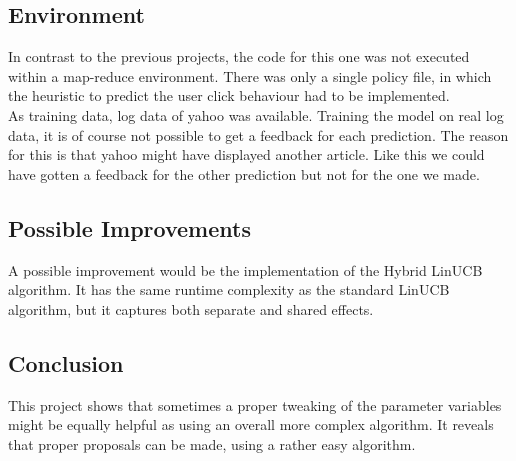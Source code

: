 \documentclass[a4paper, 11pt]{article}
\begin{document}
\subsection{Environment}
In contrast to the previous projects, the code for this one was not executed within a map-reduce environment. There was only a single policy file, in which the heuristic to predict the user click behaviour had to be implemented.\\
As training data, log data of yahoo was available. Training the model on real log data, it is of course not possible to get a feedback for each prediction. The reason for this is that yahoo might have displayed another article. Like this we could have gotten a feedback for the other prediction but not for the one we made.


\subsection{Possible Improvements}
A possible improvement would be the implementation of the Hybrid LinUCB algorithm. It has the same runtime complexity as the standard LinUCB algorithm, but it captures both separate and shared effects.

\subsection{Conclusion}
This project shows that sometimes a proper tweaking of the parameter variables might be equally helpful as using an overall more complex algorithm. It reveals that proper proposals can be made, using a rather easy algorithm.
\end{document}
